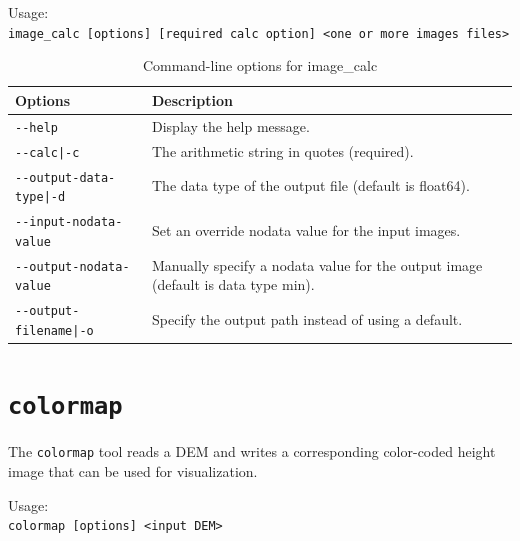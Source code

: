 \medskip

Usage:\\
\hspace*{2em}\texttt{image\_calc [options] [required calc option] <one or more images files>}

\medskip

\begin{longtable}{|l|p{10cm}|}
\caption{Command-line options for image\_calc}
\label{tbl:imagecalc}
\endfirsthead
\endhead
\endfoot
\endlastfoot
\hline
Options & Description \\ \hline \hline
\texttt{-\/-help} & Display the help message.\\ \hline
\texttt{-\/-calc|-c} & The arithmetic string in quotes (required).\\ \hline
\texttt{-\/-output-data-type|-d} & The data type of the output file (default is float64).\\ \hline
\texttt{-\/-input-nodata-value} & Set an override nodata value for the input images.\\ \hline
\texttt{-\/-output-nodata-value} & Manually specify a nodata value for the output image (default is data type min).\\ \hline
\texttt{-\/-output-filename|-o} & Specify the output path instead of using a default.\\ \hline
\end{longtable}


\section{{\tt colormap}}
\label{sec:colormap}

The \verb#colormap# tool reads a DEM and writes a corresponding color-coded height image that can be used for visualization.


\medskip

Usage:\\
\hspace*{2em}\texttt{colormap [options] <input DEM>}

\medskip


